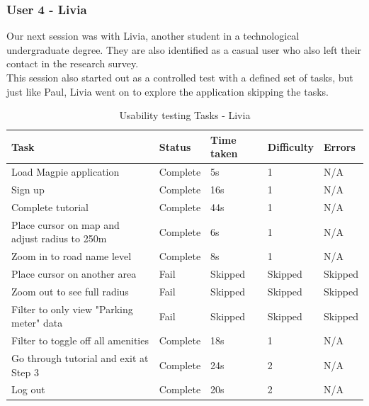 \subsubsection{User 4 - Livia}
Our next session was with Livia, another student in a technological undergraduate degree. They are also identified as a casual user who also left their contact in the research survey.\\
This session also started out as a controlled test with a defined set of tasks, but just like Paul, Livia went on to explore the application skipping the tasks.\\
\begin{table}[h!]
    \centering
    \caption{Usability testing Tasks - Livia}
    \begin{tabular}{|p{}|p{}|p{}|p{}|p{}|}
        \hline
        \textbf{Task}                                 & \textbf{Status} & \textbf{Time taken} & \textbf{Difficulty} & \textbf{Errors} \\
        \hline
        Load Magpie application                       & Complete        & 5s                  & 1                   & N/A             \\
        \hline
        Sign up                                       & Complete        & 16s                 & 1                   & N/A             \\
        \hline
        Complete tutorial                             & Complete        & 44s                 & 1                   & N/A             \\
        \hline
        Place cursor on map and adjust radius to 250m & Complete        & 6s                  & 1                   & N/A             \\
        \hline
        Zoom in to road name level                    & Complete        & 8s                  & 1                   & N/A             \\
        \hline
        Place cursor on another area                  & Fail            & Skipped             & Skipped             & Skipped         \\
        \hline
        Zoom out to see full radius                   & Fail            & Skipped             & Skipped             & Skipped         \\
        \hline
        Filter to only view "Parking meter" data      & Fail            & Skipped             & Skipped             & Skipped         \\
        \hline
        Filter to toggle off all amenities            & Complete        & 18s                 & 1                   & N/A             \\
        \hline
        Go through tutorial and exit at Step 3        & Complete        & 24s                 & 2                   & N/A             \\
        \hline
        Log out                                       & Complete        & 20s                 & 2                   & N/A             \\
        \hline
    \end{tabular}
\end{table}\\
